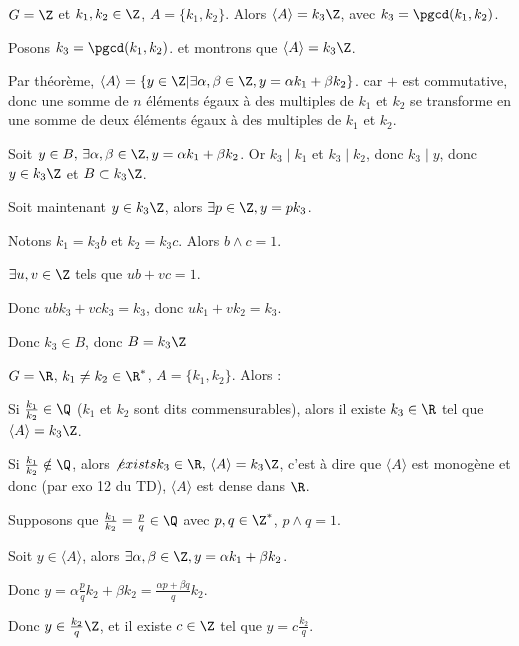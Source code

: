 \begin{exemple}
    $G = \Z$ et $k_1, k_2 \in \Z$, $A = \{k_1, k_2\}$. 
    Alors $\langle A \rangle = k_3 \Z$, avec $k_3 = \pgcd(k_1, k_2)$.

    Posons $k_3 = \pgcd(k_1, k_2)$. et montrons que $\langle A \rangle = k_3 \Z$.

    Par théorème, $\langle A \rangle = \{y \in \Z | \exists \alpha, \beta \in \Z, y = \alpha k_1 + \beta k_2\}$.
    car $+$ est commutative, donc une somme de $n$ éléments égaux à des multiples de $k_1$ et $k_2$
    se transforme en une somme de deux éléments égaux à des multiples de $k_1$ et $k_2$.

    Soit $y \in B, \, \exists \alpha, \beta \in \Z, y = \alpha k_1 + \beta k_2$. 
    Or $k_3 \mid k_1$ et $k_3 \mid k_2$, donc $k_3 \mid y$, donc $y \in k_3 \Z$ et 
    $B \subset k_3 \Z$.

    Soit maintenant $y \in k_3 \Z$, alors $\exists p \in \Z, y = p k_3$.

    Notons $k_1 = k_3 b$ et $k_2 = k_3 c$. Alors $b \wedge c = 1$.

    $\exists u, v \in \Z$ tels que $ub + vc = 1$.

    Donc $ubk_3 + vck_3 = k_3$, donc $uk_1 + vk_2 = k_3$.

    Donc $k_3 \in B$, donc $B = k_3 \Z$


    $G = \R$, $k_1 \neq k_2 \in \R^*$, $A = \{k_1, k_2\}$. Alors : 

    Si $\frac{k_1}{k_2} \in \Q$ ($k_1$ et $k_2$ sont dits commensurables), alors il existe 
    $k_3 \in \R$ tel que $\langle A \rangle = k_3 \Z$.

    Si $\frac{k_1}{k_2} \notin \Q$, alors $\not exists k_3 \in \R, \, \langle A \rangle = k_3 \Z$, 
    c'est à dire que $\langle A \rangle$ est monogène et donc (par exo 12 du TD), 
    $\langle A \rangle$ est dense dans $\R$.


    \svspace Supposons que $\frac{k_1}{k_2} = \frac p q \in \Q$ avec $p, q \in \Z^*$, $p \wedge q = 1$.

    Soit $y \in \langle A \rangle$, alors $\exists \alpha, \beta \in \Z, y = \alpha k_1 + \beta k_2$.

    Donc $\displaystyle y = \alpha \frac p q k_2 + \beta k_2 = \frac{\alpha p + \beta q} q k_2$.

    Donc $y \in \frac{k_2} q \Z$, et il existe $c \in \Z$ tel que $\displaystyle y = c \frac{k_2} q$.


\end{exemple}

